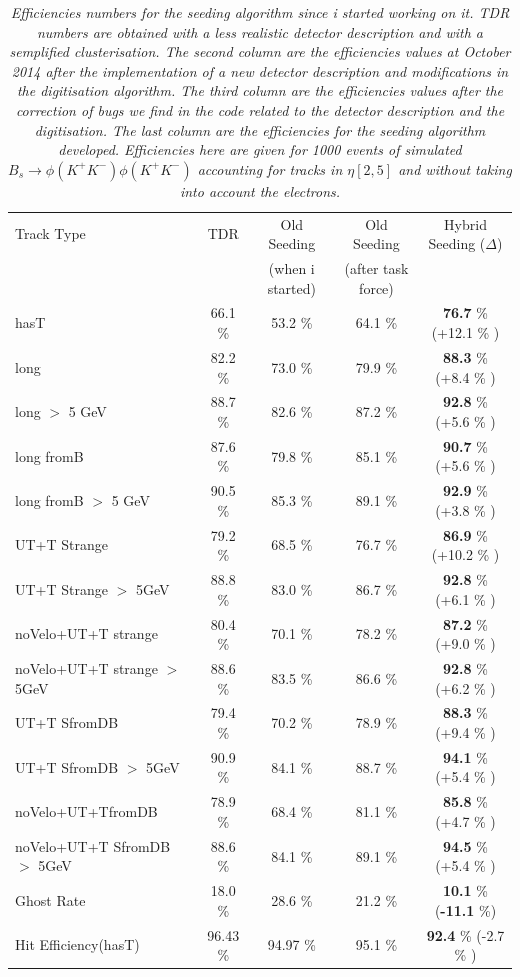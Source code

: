 \documentclass[paper=a4, fontsize=10pt]{scrartcl}
\numberwithin{equation}{section}		%
\numberwithin{figure}{section}			%
\numberwithin{table}{section}				%
\begin{document}
\begin{table}[h!]
\centering 
\begin{tabular}{|l|c|c|c|c}
Track Type & TDR & Old Seeding & Old Seeding & Hybrid Seeding ($\Delta$) \\
  & & (when i started) & (after task force) & \\
\hline
hasT & 66.1 \% &   53.2 \% & 64.1 \% & \textbf{76.7} \% (+12.1 \% )\\
long & 82.2 \% &   73.0 \% & 79.9 \% & \textbf{88.3} \% (+8.4 \% )  \\
long $>$ 5 GeV & 88.7 \% &  82.6 \% & 87.2 \% & \textbf{92.8} \%  (+5.6 \% )  \\ \hline
long fromB & 87.6 \% &  79.8 \% & 85.1 \% &\textbf{90.7} \%  (+5.6 \% )  \\
long fromB $>$ 5 GeV & 90.5 \% &  85.3 \% & 89.1 \% &\textbf{92.9} \% (+3.8 \% ) \\ \hline
UT+T Strange & 79.2 \% &  68.5 \% & 76.7 \% & \textbf{86.9} \%  (+10.2 \% ) \\
UT+T Strange $>$ 5GeV & 88.8 \% & 83.0 \% & 86.7 \% & \textbf{92.8} \%  (+6.1 \% ) \\ \hline
noVelo+UT+T strange & 80.4 \% & 70.1 \% & 78.2 \% & \textbf{87.2} \%   (+9.0 \% )  \\
noVelo+UT+T strange $>$ 5GeV & 88.6 \% & 83.5 \% & 86.6 \% & \textbf{92.8} \% (+6.2 \% ) \\ \hline
UT+T SfromDB & 79.4 \% &  70.2 \% & 78.9 \% & \textbf{88.3} \% (+9.4 \% ) \\
UT+T SfromDB $>$ 5GeV & 90.9 \% &   84.1 \% & 88.7 \% & \textbf{94.1} \% (+5.4 \% )\\ \hline
noVelo+UT+TfromDB & 78.9 \% & 68.4 \% & 81.1 \% & \textbf{85.8} \%  (+4.7 \% )\\
noVelo+UT+T SfromDB $>$ 5GeV & 88.6 \% & 84.1 \% & 89.1 \% & \textbf{94.5} \% (+5.4 \% )\\ \hline
Ghost Rate & 18.0 \% & 28.6 \% & 21.2 \% & \textbf{10.1} \%  (\textbf{-11.1} \%)  \\
Hit Efficiency(hasT) & 96.43 \% & 94.97 \% & 95.1 \% & \textbf{92.4} \% (-2.7 \% ) \\
\end{tabular}
\caption{\emph{Efficiencies numbers for the seeding algorithm since i started working on it.
TDR numbers are obtained with a less realistic detector description and with a semplified clusterisation. The second column are the efficiencies values at October 2014 after the implementation of a new detector description and modifications in the digitisation algorithm. The third column are the efficiencies values after the correction of bugs we find in the code related to the detector description and the digitisation. The last column are the efficiencies for the seeding algorithm developed. Efficiencies here are given for 1000 events of simulated $B_{s}\rightarrow \phi(K^+K^-)\phi(K^{+}K^{-})$ accounting for tracks in $\eta [2,5]$ and without taking into account the electrons.}}\label{table}
\end{table}
\end{document}
